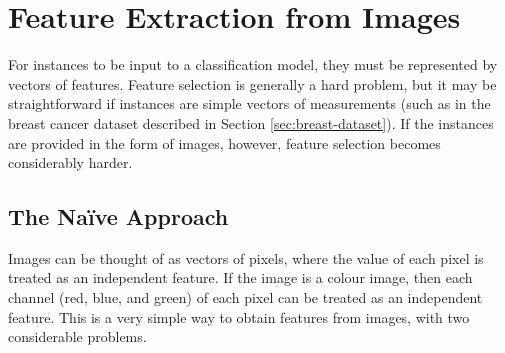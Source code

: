 \section{Feature Extraction from Images}
\label{sec:image-feature-extraction}
    
    For instances to be input to a classification model, they must be
    represented by vectors of features. Feature selection is generally a hard
    problem, but it may be straightforward if instances are simple vectors of
    measurements (such as in the breast cancer dataset described in Section
    \ref{sec:breast-dataset}). If the instances are provided in the form of
    images, however, feature selection becomes considerably harder.

    \subsection{The Na\"ive Approach}
    \label{sec:naive-approach-image-features}

        Images can be thought of as vectors of pixels, where the value of each
        pixel is treated as an independent feature. If the image is a colour
        image, then each channel (red, blue, and green) of each pixel can be
        treated as an independent feature. This is a very simple way to obtain
        features from images, with two considerable problems.

